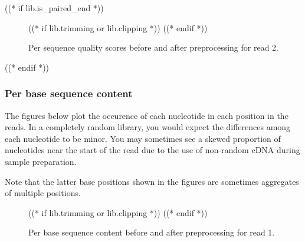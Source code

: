 ((* if lib.is_paired_end *))
    \begin{figure}[h!]
        \centering
        \begin{minipage}[b]{0.48\textwidth}
            \centering
        \end{minipage}
        \begin{minipage}[b]{0.48\textwidth}
            \centering
            ((* if lib.trimming or lib.clipping *))
            ((* endif *))
        \end{minipage}
        \caption{Per sequence quality scores before and after preprocessing for read 2.}
    \end{figure}
((* endif *))

\subsubsection{Per base sequence content}
    The figures below plot the occurence of each nucleotide in each position in
    the reads. In a completely random library, you would expect the differences
    among each nucleotide to be minor. You may sometimes see a skewed
    proportion of nucleotides near the start of the read due to the use of
    non-random cDNA during sample preparation.

    \indent

    Note that the latter base positions shown in the figures are
    sometimes aggregates of multiple positions.
    \begin{figure}[h!]
        \centering
        \begin{minipage}[b]{0.48\textwidth}
            \centering
        \end{minipage}
        \begin{minipage}[b]{0.48\textwidth}
            \centering
            ((* if lib.trimming or lib.clipping *))
            ((* endif *))
        \end{minipage}
        \caption{Per base sequence content before and after preprocessing for read 1.}
    \end{figure}

